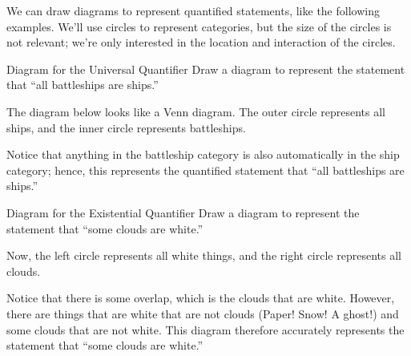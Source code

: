 We can draw diagrams to represent quantified statements, like the following examples.  We'll use circles to represent categories, but the size of the circles is not relevant; we're only interested in the location and interaction of the circles.

\begin{example}[https://www.youtube.com/watch?v=y1Rm8lB3fzw]{Diagram for the Universal Quantifier}
Draw a diagram to represent the statement that ``all battleships are ships.''

\sol
The diagram below looks like a Venn diagram.  The outer circle represents all ships, and the inner circle represents battleships.

\begin{center}
\end{center}

Notice that anything in the battleship category is also automatically in the ship category; hence, this represents the quantified statement that ``all battleships are ships.''
\end{example}
\pagebreak

\begin{example}[https://www.youtube.com/watch?v=m21zOUD-c4w]{Diagram for the Existential Quantifier}
Draw a diagram to represent the statement that ``some clouds are white.''

\sol
Now, the left circle represents all white things, and the right circle represents all clouds.

\begin{center}
\end{center}

Notice that there is some overlap, which is the clouds that are white.  However, there are things that are white that are not clouds (Paper! Snow! A ghost!) and some clouds that are not white.  This diagram therefore accurately represents the statement that ``some clouds are white.''
\end{example}

